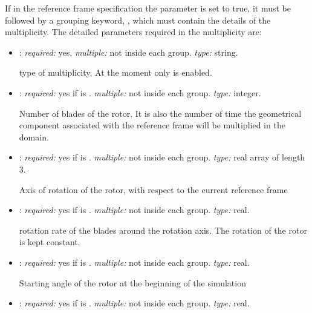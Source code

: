 If in the reference frame specification the parameter  
is set to true, it must be followed by a grouping keyword, , 
which must contain the details of the multiplicity. The detailed parameters 
required in the multiplicity are:
\begin{itemize}
	\item {}: \textit{required:} yes. \textit{multiple:} 
    not inside each  group. \textit{type:} string.
    
	type of multiplicity. At the moment only  is enabled.
    
    \item {}: \textit{required:} yes if  
    is . \textit{multiple:} not inside each  group. 
    \textit{type:} integer.
    
    Number of blades of the rotor. It is also the number of time the geometrical 
    component associated with the reference frame will be multiplied in the domain. 
    
    \item {}: \textit{required:} yes if  is . 
    \textit{multiple:} not inside each  group. 
    \textit{type:} real array of length 3.
    
    Axis of rotation of the rotor, with respect to the current reference frame
    
    \item {}: \textit{required:} yes if  is . 
    \textit{multiple:} not inside each  group. \textit{type:} real.
    
    rotation rate of the blades around the rotation axis. 
    The rotation of the rotor is kept constant.
    
    \item {}: \textit{required:} yes if  is . 
    \textit{multiple:} not inside each  group. \textit{type:} real.
    
    Starting angle of the rotor at the beginning of the simulation
    
    \item {}: \textit{required:} yes if  is . 
    \textit{multiple:} not inside each  group. \textit{type:} real. 
    

\end{itemize}
